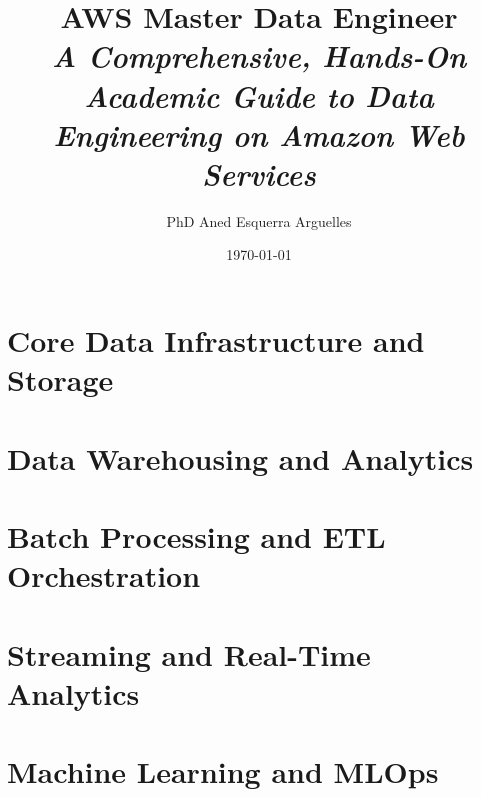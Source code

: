 \documentclass[11pt,a4paper,oneside]{book}
\title{\Huge \textbf{AWS Master Data Engineer}\\[1em]
\Large \textit{A Comprehensive, Hands-On Academic Guide to Data Engineering on Amazon Web Services}}
\author{PhD Aned Esquerra Arguelles}
\date{\today}
\begin{document}
\frontmatter



\tableofcontents
\listoffigures
\listoftables

\mainmatter

\setcounter{chapter}{-1}


\part{Core Data Infrastructure and Storage}




% 

\part{Data Warehousing and Analytics}





\part{Batch Processing and ETL Orchestration}





\part{Streaming and Real-Time Analytics}





\part{Machine Learning and MLOps}




\end{document}

